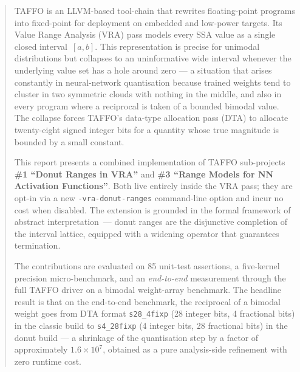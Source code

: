 \documentclass[11pt,a4paper]{article}
\theoremstyle{plain}
\begin{document}
\clearpage
\begin{abstract}
TAFFO is an LLVM-based tool-chain that rewrites floating-point programs
into fixed-point for deployment on embedded and low-power targets. Its
Value Range Analysis (VRA) pass models every SSA value as a single closed
interval~$[a,b]$. This representation is precise for unimodal
distributions but collapses to an uninformative wide interval whenever
the underlying value set has a hole around zero --- a situation that
arises constantly in neural-network quantisation because trained weights
tend to cluster in two symmetric clouds with nothing in the middle, and
also in every program where a reciprocal is taken of a bounded bimodal
value. The collapse forces TAFFO's data-type allocation pass (DTA) to
allocate twenty-eight signed integer bits for a quantity whose true
magnitude is bounded by a small constant.

This report presents a combined implementation of TAFFO sub-projects
\textbf{\#1 ``Donut Ranges in VRA''} and \textbf{\#3 ``Range Models for
NN Activation Functions''}. Both live entirely inside the VRA pass; they
are opt-in via a new \texttt{-vra-donut-ranges} command-line option and
incur no cost when disabled. The extension is grounded in the formal
framework of abstract interpretation~--- donut ranges are the
disjunctive completion of the interval lattice, equipped with a
widening operator that guarantees termination.

The contributions are evaluated on 85 unit-test assertions, a five-kernel
precision micro-benchmark, and an \emph{end-to-end} measurement through
the full TAFFO driver on a bimodal weight-array benchmark. The headline
result is that on the end-to-end benchmark, the reciprocal of a bimodal
weight goes from DTA format \texttt{s28\_4fixp} (28 integer bits, 4
fractional bits) in the classic build to \texttt{s4\_28fixp} (4 integer
bits, 28 fractional bits) in the donut build --- a shrinkage of the
quantisation step by a factor of approximately $1.6\times 10^7$,
obtained as a pure analysis-side refinement with zero runtime cost.
\end{abstract}

\clearpage
\tableofcontents
\vspace{1.5em}
\listoffigures
\vspace{1em}
\listoftables
\clearpage

\end{document}
